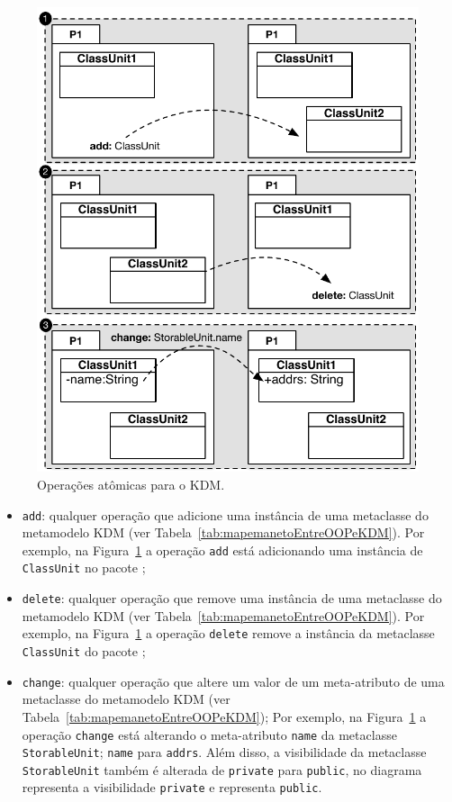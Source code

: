 \begin{figure}[h]
	\centering
	\caption{Operações atômicas para o KDM.}
	\label{fig:operacoes_atomicas_figuras}
	\includegraphics[scale=0.7]{images/identificarOperacoesFig2}
	\fautor
\end{figure}

\begin{itemize}
\item \texttt{add}: qualquer operação que adicione uma instância de uma metaclasse do metamodelo KDM (ver Tabela~\ref{tab:mapemanetoEntreOOPeKDM}). Por exemplo, na Figura~\ref{fig:operacoes_atomicas_figuras}  a operação \texttt{add} está adicionando uma instância de \texttt{ClassUnit} no pacote ;
\item \texttt{delete}: qualquer operação que remove uma instância de uma metaclasse do metamodelo KDM (ver Tabela~\ref{tab:mapemanetoEntreOOPeKDM}). Por exemplo, na Figura~\ref{fig:operacoes_atomicas_figuras}  a operação \texttt{delete} remove a instância da metaclasse \texttt{ClassUnit} do pacote ;
\item \texttt{change}: qualquer operação que altere um valor de um meta-atributo de uma metaclasse do metamodelo KDM (ver Tabela~\ref{tab:mapemanetoEntreOOPeKDM}); Por exemplo, na Figura~\ref{fig:operacoes_atomicas_figuras}  a operação \texttt{change} está alterando o meta-atributo \texttt{name} da metaclasse \texttt{StorableUnit}; \texttt{name} para \texttt{addrs}. Além disso, a visibilidade da metaclasse \texttt{StorableUnit} também é alterada de \texttt{private} para \texttt{public}, no diagrama \aspas{-} representa a visibilidade \texttt{private} e \aspas{+} representa \texttt{public}.  
\end{itemize}

